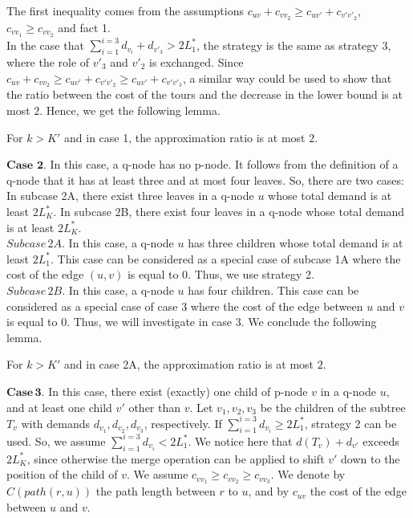 \noindent The first inequality comes from the assumptions $c_{uv}+c_{vv_2} \ge c_{uv'}+c_{v'v'_2}$, $c_{vv_1} \ge c_{vv_2}$ and fact 1. \\
\indent In the case that $\sum_{i=1}^{i=3} d_{v_i}+d_{v'_3} > 2L_1^*$, the strategy is the same as strategy 3, where the role of $v'_3$ and $v'_2$ is exchanged. Since $c_{uv}+c_{vv_2} \ge c_{uv'}+c_{v'v'_2} \ge c_{uv'}+c_{v'v'_3}$, a similar way could be used to show that the ratio between the cost of the tours and the decrease in the lower bound is at most $2$. Hence, we get the following lemma.
 \begin{lemma}
For $k > K'$ and in case 1, the approximation ratio is at most $2$.
\end{lemma}

\indent $\mathbf{Case \,\, 2.}$ In this case, a q-node has no p-node. It follows from the definition of a q-node that it has at least three and at most four leaves. So, there are two cases: In subcase 2A, there exist three leaves in a q-node $u$ whose total demand is at least $2L_K^*$. In subcase 2B, there exist four leaves in a q-node whose total demand is at least $2L_K^*$. \\
\indent $Subcase \, 2A .$ In this case, a q-node $u$ has three children whose total demand is at least $2L_1^*$. This case can be considered as a special case of subcase 1A where the cost of the edge $(u,v)$ is equal to $0$. Thus, we use strategy 2.\\
\indent $Subcase \, 2B.$ In this case, a q-node $u$ has four children. This case can be considered as a special case of case 3 where the cost of the edge between $u$ and $v$ is equal to $0$. Thus, we will investigate in case 3. We conclude the following lemma.
\begin{lemma}
For $k > K'$ and in case 2A, the approximation ratio is at most $2$.
\end{lemma}

\indent $\mathbf{Case\, 3.}$ In this case, there exist (exactly) one child of p-node $v$ in a q-node $u$, and at least one child $v'$ other than $v$. Let $v_1, v_2,v_3$ be the children of the subtree $T_{v}$ with demands $d_{v_1}, d_{v_2}, d_{v_3}$, respectively. If $\sum_{i=1}^{i=3}d_{v_i} \ge 2L_1^*$, strategy 2 can be used. So, we assume $\sum_{i=1}^{i=3}d_{v_i} < 2L_1^*$. We notice here that $d(T_v)+ d_{v'}$ exceeds $2L_K^*$, since otherwise the merge operation can be applied to shift $v'$ down to the position of the child of $v$. We assume $c_{vv_1} \ge c_{vv_2} \ge c_{vv_3}$. We denote by $C(path(r,u))$ the path length between $r$ to $u$, and by $c_{uv}$ the cost of the edge between $u$ and $v$.\\

